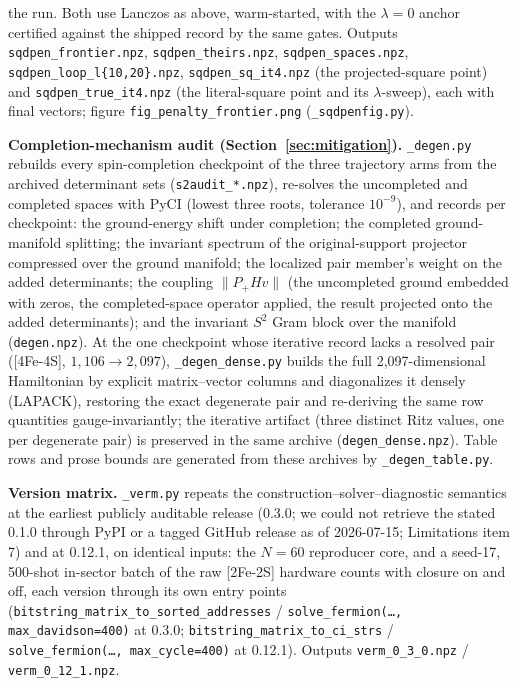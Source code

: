 \documentclass[11pt]{article}
\begin{document}
the run. Both use Lanczos as above, warm-started, with the $\lambda=0$ anchor certified against the shipped record by the same gates. Outputs \texttt{sqdpen\_frontier.npz}, \texttt{sqdpen\_theirs.npz}, \texttt{sqdpen\_spaces.npz}, \texttt{sqdpen\_loop\_l\{10,20\}.npz}, \texttt{sqdpen\_sq\_it4.npz} (the projected-square point) and \texttt{sqdpen\_true\_it4.npz} (the literal-square point and its $\lambda$-sweep), each with final vectors; figure \texttt{fig\_penalty\_frontier.png} (\texttt{\_sqdpenfig.py}).

\textbf{Completion-mechanism audit (Section~\ref{sec:mitigation}).} \texttt{\_degen.py} rebuilds every spin-completion checkpoint of the three trajectory arms from the archived determinant sets (\texttt{s2audit\_*.npz}), re-solves the uncompleted and completed spaces with PyCI (lowest three roots, tolerance $10^{-9}$), and records per checkpoint: the ground-energy shift under completion; the completed ground-manifold splitting; the invariant spectrum of the original-support projector compressed over the ground manifold; the localized pair member's weight on the added determinants; the coupling $\|P_+ H v\|$ (the uncompleted ground embedded with zeros, the completed-space operator applied, the result projected onto the added determinants); and the invariant $S^2$ Gram block over the manifold (\texttt{degen.npz}). At the one checkpoint whose iterative record lacks a resolved pair ([4Fe-4S], $1{,}106 \to 2{,}097$), \texttt{\_degen\_dense.py} builds the full 2,097-dimensional Hamiltonian by explicit matrix--vector columns and diagonalizes it densely (LAPACK), restoring the exact degenerate pair and re-deriving the same row quantities gauge-invariantly; the iterative artifact (three distinct Ritz values, one per degenerate pair) is preserved in the same archive (\texttt{degen\_dense.npz}). Table rows and prose bounds are generated from these archives by \texttt{\_degen\_table.py}.

\textbf{Version matrix.} \texttt{\_verm.py} repeats the construction--solver--diagnostic semantics at the earliest publicly auditable release (0.3.0; we could not retrieve the stated 0.1.0 through PyPI or a tagged GitHub release as of 2026-07-15; Limitations item 7) and at 0.12.1, on identical inputs: the $N=60$ reproducer core, and a seed-17, 500-shot in-sector batch of the raw [2Fe-2S] hardware counts with closure on and off, each version through its own entry points (\texttt{bitstring\_matrix\_to\_sorted\_addresses} / \texttt{solve\_fermion(\ldots, max\_davidson=400)} at 0.3.0; \texttt{bitstring\_matrix\_to\_ci\_strs} / \texttt{solve\_fermion(\ldots, max\_cycle=400)} at 0.12.1). Outputs \texttt{verm\_0\_3\_0.npz} / \texttt{verm\_0\_12\_1.npz}.
\end{document}
